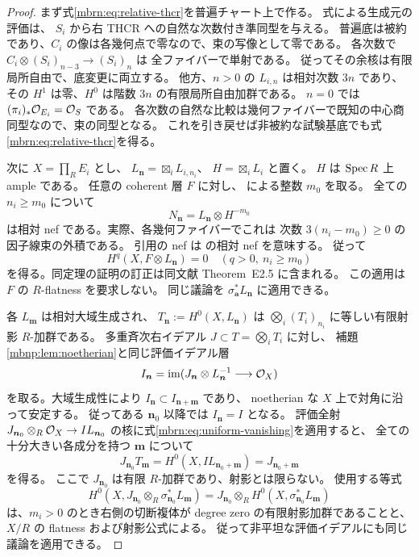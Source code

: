 \begin{proof}
まず式\eqref{mbrn:eq:relative-thcr}を普遍チャート上で作る。
式による生成元の評価は、
$S_i$ から右 THCR への自然な次数付き準同型を与える。
普遍底は被約であり、$C_i$ の像は各幾何点で零なので、束の写像として零である。
各次数で $C_i\otimes(S_i)_{n-3}\to(S_i)_n$ は
全ファイバーで単射である。
従ってその余核は有限局所自由で、底変更に両立する。
他方、$n>0$ の $L_{i,n}$ は相対次数 $3n$ であり、
その $H^1$ は零、$H^0$ は階数 $3n$ の有限局所自由加群である。
$n=0$ では $(\pi_i)_*\mathcal O_{E_i}=\mathcal O_S$ である。
各次数の自然な比較は幾何ファイバーで既知の中心商同型なので、束の同型となる。
これを引き戻せば非被約な試験基底でも式\eqref{mbrn:eq:relative-thcr}を得る。

次に $X=\prod_RE_i$ とし、
$L_{\boldsymbol n}=\boxtimes_iL_{i,n_i}$、
$H=\boxtimes_iL_i$ と置く。
$H$ は $\operatorname{Spec} R$ 上 ample である。
任意の coherent 層 $F$ に対し、
\cite[Theorem~1.5]{NFMKeelerAmple}による整数 $m_0$ を取る。
全ての $n_i\geq m_0$ について
\[
 N_{\boldsymbol n}=L_{\boldsymbol n}\otimes H^{-m_0}
\]
は相対 nef である。実際、各幾何ファイバーでこれは
次数 $3(n_i-m_0)\geq0$ の因子線束の外積である。
引用の nef は \cite[Definition~2.9]{NFMKeelerAmple}の相対 nef を意味する。
従って
\begin{equation}\label{mbrn:eq:uniform-vanishing}
 H^q(X,F\otimes L_{\boldsymbol n})=0
 \quad(q>0,\ n_i\geq m_0)
\end{equation}
を得る。同定理の証明の訂正は同文献 Theorem~E2.5 に含まれる。
この適用は $F$ の $R$-flatness を要求しない。
同じ議論を $\sigma_{\boldsymbol a}^*L_{\boldsymbol n}$ に適用できる。

各 $L_{\boldsymbol m}$ は相対大域生成され、
$T_{\boldsymbol n}:=H^0(X,L_{\boldsymbol n})$ は
$\bigotimes_i(T_i)_{n_i}$ に等しい有限射影 $R$-加群である。
多重斉次右イデアル $J\subset T=\bigotimes_iT_i$ に対し、
補題\ref{mbnp:lem:noetherian}と同じ評価イデアル層
\[
 I_{\boldsymbol n}=
  \operatorname{im}(J_{\boldsymbol n}\otimes L_{\boldsymbol n}^{-1}
                      \longrightarrow\mathcal O_X)
\]
を取る。大域生成性により
$I_{\boldsymbol n}\subset I_{\boldsymbol n+\boldsymbol m}$ であり、
noetherian な $X$ 上で対角に沿って安定する。
従ってある $\boldsymbol n_0$ 以降では $I_{\boldsymbol n}=I$ となる。
評価全射
$J_{\boldsymbol n_0}\otimes_R\mathcal O_X\to I L_{\boldsymbol n_0}$
の核に式\eqref{mbrn:eq:uniform-vanishing}を適用すると、
全ての十分大きい各成分を持つ $\boldsymbol m$ について
\[
 J_{\boldsymbol n_0}T_{\boldsymbol m}
   =H^0(X,I L_{\boldsymbol n_0+\boldsymbol m})
   =J_{\boldsymbol n_0+\boldsymbol m}
\]
を得る。
ここで $J_{\boldsymbol n_0}$ は有限 $R$-加群であり、射影とは限らない。
使用する等式
\[
 H^0(X,J_{\boldsymbol n_0}\otimes_R
                    \sigma_{\boldsymbol n_0}^*L_{\boldsymbol m})
 =J_{\boldsymbol n_0}\otimes_R
                    H^0(X,\sigma_{\boldsymbol n_0}^*L_{\boldsymbol m})
\]
は、$m_i>0$ のとき右側の切断複体が degree zero の有限射影加群であることと、
$X/R$ の flatness および射影公式による。
従って非平坦な評価イデアルにも同じ議論を適用できる。


\end{proof}
